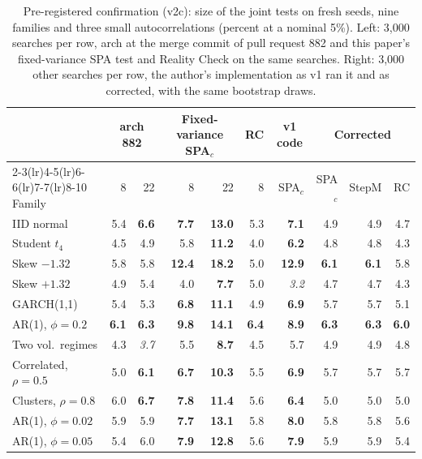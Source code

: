 \begin{table}[t]
\centering
\footnotesize
\setlength{\tabcolsep}{3.5pt}
\caption{Pre-registered confirmation (v2c): size of the joint tests on fresh seeds, nine families and three small autocorrelations (percent at a nominal 5\%). Left: 3{,}000 searches per row, arch at the merge commit of pull request 882 and this paper's fixed-variance SPA test and Reality Check on the same searches. Right: 3{,}000 other searches per row, the author's implementation as v1 ran it and as corrected, with the same bootstrap draws.}
\label{tab:confirm-joint}
\begin{tabular}{lrrrrrrrrr}
\toprule
 & \multicolumn{2}{c}{arch 882} & \multicolumn{2}{c}{Fixed-variance SPA$_c$} & \multicolumn{1}{c}{RC} & \multicolumn{1}{c}{v1 code} & \multicolumn{3}{c}{Corrected} \\
\cmidrule(lr){2-3}\cmidrule(lr){4-5}\cmidrule(lr){6-6}\cmidrule(lr){7-7}\cmidrule(lr){8-10}
Family & 8 & 22 & 8 & 22 & 8 & SPA$_c$ & SPA$_c$ & StepM & RC \\
\midrule
IID normal & 5.4 & \textbf{6.6} & \textbf{7.7} & \textbf{13.0} & 5.3 & \textbf{7.1} & 4.9 & 4.9 & 4.7 \\
Student $t_4$ & 4.5 & 4.9 & 5.8 & \textbf{11.2} & 4.0 & \textbf{6.2} & 4.8 & 4.8 & 4.3 \\
Skew $-1.32$ & 5.8 & 5.8 & \textbf{12.4} & \textbf{18.2} & 5.0 & \textbf{12.9} & \textbf{6.1} & \textbf{6.1} & 5.8 \\
Skew $+1.32$ & 4.9 & 5.4 & 4.0 & \textbf{7.7} & 5.0 & \textit{3.2} & 4.7 & 4.7 & 4.3 \\
GARCH(1,1) & 5.4 & 5.3 & \textbf{6.8} & \textbf{11.1} & 4.9 & \textbf{6.9} & 5.7 & 5.7 & 5.1 \\
AR(1), $\phi=0.2$ & \textbf{6.1} & \textbf{6.3} & \textbf{9.8} & \textbf{14.1} & \textbf{6.4} & \textbf{8.9} & \textbf{6.3} & \textbf{6.3} & \textbf{6.0} \\
Two vol.\ regimes & 4.3 & \textit{3.7} & 5.5 & \textbf{8.7} & 4.5 & 5.7 & 4.9 & 4.9 & 4.8 \\
Correlated, $\rho=0.5$ & 5.0 & \textbf{6.1} & \textbf{6.7} & \textbf{10.3} & 5.5 & \textbf{6.9} & 5.7 & 5.7 & 5.7 \\
Clusters, $\rho=0.8$ & 6.0 & \textbf{6.7} & \textbf{7.8} & \textbf{11.4} & 5.6 & \textbf{6.4} & 5.0 & 5.0 & 5.0 \\
AR(1), $\phi=0.02$ & 5.9 & 5.9 & \textbf{7.7} & \textbf{13.1} & 5.8 & \textbf{8.0} & 5.8 & 5.8 & 5.6 \\
AR(1), $\phi=0.05$ & 5.4 & 6.0 & \textbf{7.9} & \textbf{12.8} & 5.6 & \textbf{7.9} & 5.9 & 5.9 & 5.4 \\

\end{tabular}
\end{table}
